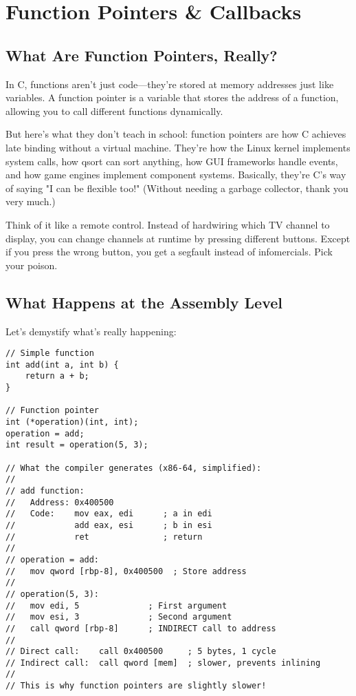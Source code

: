 \chapter{Function Pointers \& Callbacks}

\section{What Are Function Pointers, Really?}

In C, functions aren't just code—they're stored at memory addresses just like variables. A function pointer is a variable that stores the address of a function, allowing you to call different functions dynamically.

But here's what they don't teach in school: function pointers are how C achieves late binding without a virtual machine. They're how the Linux kernel implements system calls, how qsort can sort anything, how GUI frameworks handle events, and how game engines implement component systems. Basically, they're C's way of saying "I can be flexible too!" (Without needing a garbage collector, thank you very much.)

Think of it like a remote control. Instead of hardwiring which TV channel to display, you can change channels at runtime by pressing different buttons. Except if you press the wrong button, you get a segfault instead of infomercials. Pick your poison.

\section{What Happens at the Assembly Level}

Let's demystify what's really happening:

\begin{lstlisting}
// Simple function
int add(int a, int b) {
    return a + b;
}

// Function pointer
int (*operation)(int, int);
operation = add;
int result = operation(5, 3);

// What the compiler generates (x86-64, simplified):
//
// add function:
//   Address: 0x400500
//   Code:    mov eax, edi      ; a in edi
//            add eax, esi      ; b in esi
//            ret               ; return
//
// operation = add:
//   mov qword [rbp-8], 0x400500  ; Store address
//
// operation(5, 3):
//   mov edi, 5              ; First argument
//   mov esi, 3              ; Second argument
//   call qword [rbp-8]      ; INDIRECT call to address
//
// Direct call:    call 0x400500     ; 5 bytes, 1 cycle
// Indirect call:  call qword [mem]  ; slower, prevents inlining
//
// This is why function pointers are slightly slower!
\end{lstlisting}

